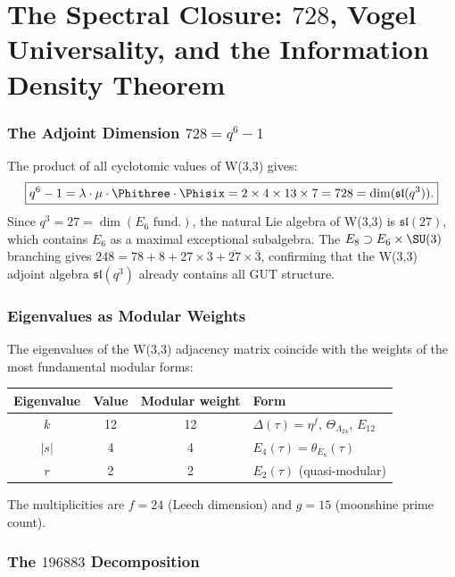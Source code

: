 \clearpage
\part{The Spectral Closure: $728$, Vogel Universality, and the Information Density Theorem}

\section{The Adjoint Dimension $728 = q^6 - 1$}

The product of all cyclotomic values of W(3,3) gives:
\begin{equation}
\boxed{q^6-1 = \lambda\cdot\mu\cdot\Phithree\cdot\Phisix = 2\times 4\times 13\times 7 = 728 = \dim(\mathfrak{sl}(q^3)).}
\end{equation}
Since $q^3 = 27 = \dim(E_6\text{ fund.})$, the natural Lie algebra of W(3,3)
is $\mathfrak{sl}(27)$, which contains $E_6$ as a maximal exceptional subalgebra.
The $E_8\supset E_6\times\SU(3)$ branching gives
$248 = 78 + 8 + 27\times 3 + \overline{27}\times\overline{3}$,
confirming that the W(3,3) adjoint algebra $\mathfrak{sl}(q^3)$
already contains all GUT structure.

\section{Eigenvalues as Modular Weights}

The eigenvalues of the W(3,3) adjacency matrix coincide with the
weights of the most fundamental modular forms:
\begin{center}
\begin{tabular}{@{}cccl@{}}
\toprule
Eigenvalue & Value & Modular weight & Form \\
\midrule
$k$ & 12 & 12 & $\Delta(\tau)=\eta^f$, $\Theta_{\Lambda_{24}}$, $E_{12}$ \\
$|s|$ & 4 & 4 & $E_4(\tau) = \theta_{E_8}(\tau)$ \\
$r$ & 2 & 2 & $E_2(\tau)$ (quasi-modular) \\
\bottomrule
\end{tabular}
\end{center}
The multiplicities are $f=24$ (Leech dimension) and $g=15$
(moonshine prime count).

\section{The $196883$ Decomposition}

